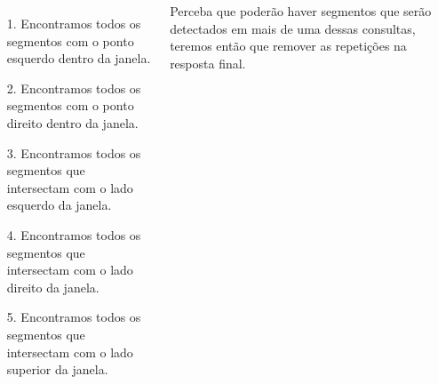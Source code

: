 \documentclass[17pt,a1paper,portrait]{tikzposter}
\begin{document}
\begin{columns}
{{    \begin{itemize}
    \item[1.] Encontramos todos os segmentos com o ponto esquerdo dentro da janela. 
    \item[2.] Encontramos todos os segmentos com o ponto direito dentro da janela. 
    \item[3.] Encontramos todos os segmentos que intersectam com o lado esquerdo da janela.
    \item[4.] Encontramos todos os segmentos que intersectam com o lado direito da janela.
    \item[5.] Encontramos todos os segmentos que intersectam com o lado superior da janela.\\
    \end{itemize}
    
    Perceba que poderão haver segmentos que serão detectados em mais de uma dessas consultas, teremos então que remover as
    repetições na resposta final.

}}


  



{}
\end{columns}
\end{document}
